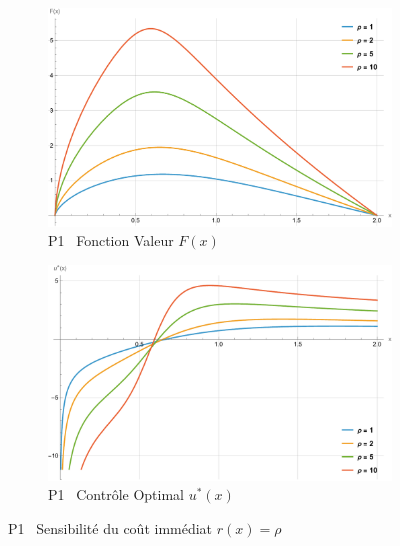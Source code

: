 \begin{figure}[htb]
    \centering
    \begin{subfigure}{0.49\linewidth}
        \includegraphics[width=\linewidth]{img/validation/P1/p1_R_value.pdf}
        \caption{P1 \textemdash~Fonction Valeur $F(x)$}\label{fig:RhoValueVisualisation1}
    \end{subfigure}
    \hfill
    \begin{subfigure}{0.49\linewidth}
        \includegraphics[width=\linewidth]{img/validation/P1/p1_R_control.pdf}
        \caption{P1 \textemdash~Contrôle Optimal $u^*(x)$}\label{fig:RhoControlVisualisation1}
    \end{subfigure}
    \caption{P1 \textemdash~Sensibilité du coût immédiat $r(x)=\rho$}\label{fig:RhoValueControlComparison1}
\end{figure}
